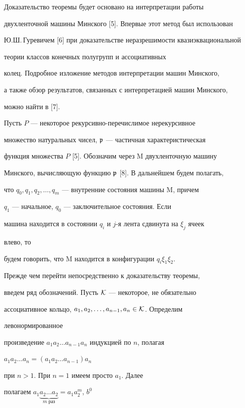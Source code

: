 Доказательство теоремы будет основано на интерпретации работы 


двухленточной машины Минского [5]. Впервые этот метод был использован  


Ю.Ш.\,Гуревичем [6] при доказательстве неразрешимости квазиэквациональной  


теории классов конечных полугрупп и ассоциативных  


колец. Подробное изложение методов интерпретации машин Минского,  


а также обзор результатов, связанных с интерпретацией машин Минского,  


можно найти в [7]. 


 


Пусть $P$ --- некоторое рекурсивно-перечислимое нерекурсивное  


множество натуральных чисел, $\frak p$ --- частичная характеристическая 


функция множества $P$ [5]. Обозначим через M двухленточную машину  


Минского, вычисляющую функцию $\frak p$ [8]. В дальнейшем будем полагать,  


что $q_0,q_1,q_2,\dotsc,q_m$ --- внутренние состояния машины M, причем  


$q_1$ --- начальное, $q_0$ --- заключительное состояния. Если  


машина находится в состоянии $q_i$ и $j$-я лента сдвинута на $\xi_j$ ячеек 


влево, то  


будем говорить, что M находится в конфигурации $q_i\xi_1\xi_2$. 


 


Прежде чем перейти непосредственно к доказательству теоремы,  


введем ряд обозначений. Пусть $\cal K$ --- некоторое, не обязательно 


ассоциативное кольцо, $a_1,a_2,\dotsc,a_{n-1},a_n\in\cal K$. Определим 


левонормированное  


произведение $a_1a_2\dotsc a_{n-1}a_n$ индукцией по $n$, полагая 


$a_1a_2\dotsc a_n=(a_1a_2\dotsc a_{n-1})a_n$ 


при $n>1$. При $n=1$ имеем просто $a_1$. Далее  


полагаем $a_1\underbrace{a_2\dotsc a_2}_{m\text{ раз}}=a_1a^m_2$, $b^0$ 


